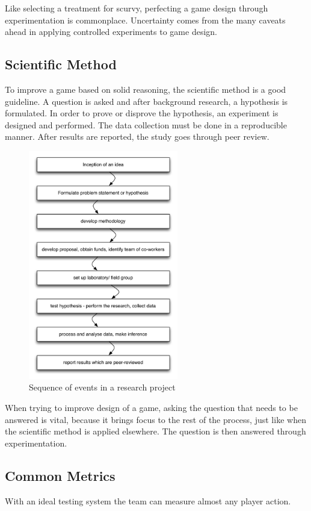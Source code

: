 \documentclass[english,12pt,a4paper,pdftex,elec,utf8]{aaltothesis}
\begin{document}
Like selecting a treatment for scurvy, perfecting a game design through experimentation is commonplace. Uncertainty comes from the many caveats ahead in applying controlled experiments to game design.

\subsection{Scientific Method}
To improve a game based on solid reasoning, the scientific method is a good guideline. A question is asked and after background research, a hypothesis is formulated. In order to prove or disprove the hypothesis, an experiment is designed and performed. The data collection must be done in a reproducible manner. After results are reported, the study goes through peer review.\cite[p. 224]{Crawford1990}

\begin{figure}[htb]
\centering \includegraphics[height=10cm]{diagrams/research_sequence_Crawford1990}
\caption{Sequence of events in a research project \cite[p. 224]{Crawford1990}\label{research}}
\end{figure}

When trying to improve design of a game, asking the question that needs to be answered is vital, because it brings focus to the rest of the process, just like when the scientific method is applied elsewhere. The question is then answered through experimentation.

\subsection{Common Metrics}
With an ideal testing system the team can measure almost any player action.
\end{document}
